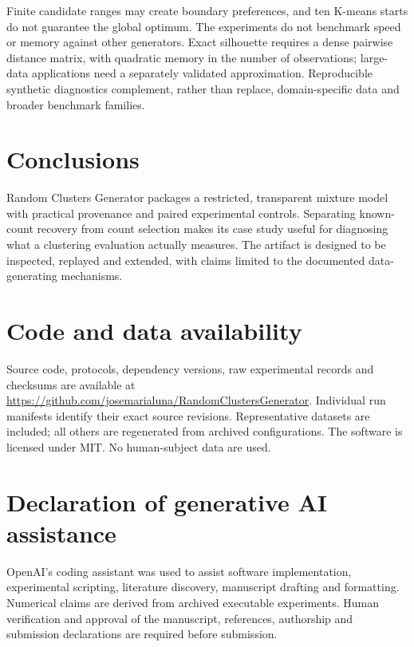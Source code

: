 \documentclass[preprint,12pt]{elsarticle}
\begin{document}
Finite candidate ranges may create boundary preferences, and ten K-means
starts do not guarantee the global optimum. The experiments do not benchmark
speed or memory against other generators. Exact silhouette requires a dense
pairwise distance matrix, with quadratic memory in the number of observations;
large-data applications need a separately validated approximation. Reproducible
synthetic diagnostics complement, rather than replace, domain-specific data
and broader benchmark families.

\section{Conclusions}
Random Clusters Generator packages a restricted, transparent mixture model
with practical provenance and paired experimental controls. Separating
known-count recovery from count selection makes its case study useful for
diagnosing what a clustering evaluation actually measures. The artifact is
designed to be inspected, replayed and extended, with claims limited to the
documented data-generating mechanisms.

\section*{Code and data availability}
Source code, protocols, dependency versions, raw experimental records and
checksums are available at
\url{https://github.com/josemarialuna/RandomClustersGenerator}.
Individual run manifests identify their exact source revisions. Representative
datasets are included; all others are regenerated from archived configurations.
The software is licensed under MIT. No human-subject data are used.

\section*{Declaration of generative AI assistance}
OpenAI's coding assistant was used to assist software implementation,
experimental scripting, literature discovery, manuscript drafting and formatting.
Numerical claims are derived from archived executable experiments. Human
verification and approval of the manuscript, references, authorship and
submission declarations are required before submission.



\end{document}
